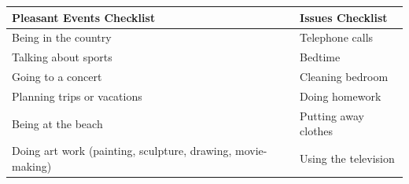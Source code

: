 \documentclass[]{book}
\begin{document}
\begin{longtable}[]{@{}ll@{}}
\toprule
\begin{minipage}[b]{0.50\columnwidth}\raggedright
Pleasant Events Checklist\strut
\end{minipage} & \begin{minipage}[b]{0.44\columnwidth}\raggedright
Issues Checklist\strut
\end{minipage}\tabularnewline
\midrule
\endhead
\begin{minipage}[t]{0.50\columnwidth}\raggedright
Being in the country\strut
\end{minipage} & \begin{minipage}[t]{0.44\columnwidth}\raggedright
Telephone calls\strut
\end{minipage}\tabularnewline
\begin{minipage}[t]{0.50\columnwidth}\raggedright
Talking about sports\strut
\end{minipage} & \begin{minipage}[t]{0.44\columnwidth}\raggedright
Bedtime\strut
\end{minipage}\tabularnewline
\begin{minipage}[t]{0.50\columnwidth}\raggedright
Going to a concert\strut
\end{minipage} & \begin{minipage}[t]{0.44\columnwidth}\raggedright
Cleaning bedroom\strut
\end{minipage}\tabularnewline
\begin{minipage}[t]{0.50\columnwidth}\raggedright
Planning trips or vacations\strut
\end{minipage} & \begin{minipage}[t]{0.44\columnwidth}\raggedright
Doing homework\strut
\end{minipage}\tabularnewline
\begin{minipage}[t]{0.50\columnwidth}\raggedright
Being at the beach\strut
\end{minipage} & \begin{minipage}[t]{0.44\columnwidth}\raggedright
Putting away clothes\strut
\end{minipage}\tabularnewline
\begin{minipage}[t]{0.50\columnwidth}\raggedright
Doing art work (painting, sculpture, drawing, movie-making)\strut
\end{minipage} & \begin{minipage}[t]{0.44\columnwidth}\raggedright
Using the television\strut
\end{minipage}\tabularnewline

\end{longtable}
\end{document}

